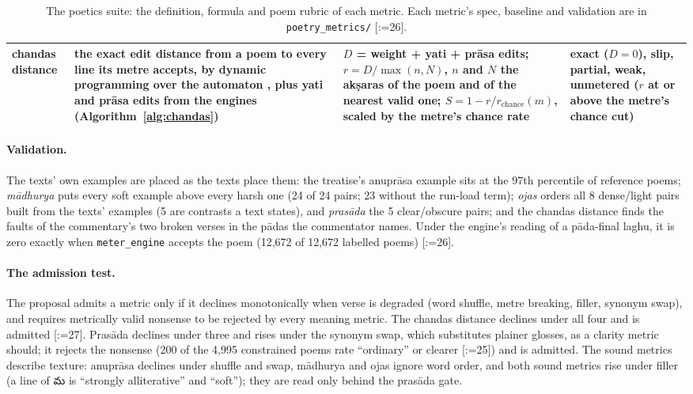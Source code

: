 \documentclass[11pt]{article}
\makeatletter
\newcommand{\te}[1]{{\telugufont #1}}
\DeclareRobustCommand{\exref}[1]{{\scriptsize[\def\ex@sep{}\@for\ex@i:=#1\do{\ex@sep
  \expandafter\ex@item\expandafter{\ex@i}\def\ex@sep{, }}]}}
\newcommand{\ex@item}[1]{\in@{-}{#1}\ifin@\ex@range#1\@nil\else\ex@link{#1}\fi}
\def\ex@range#1-#2\@nil{\ex@link{#1}--\ex@link{#2}}
\newcommand{\ex@link}[1]{\hyperref[exp:E#1]{E#1}}
\makeatother
\begin{document}
\begin{table}[t]
\begin{tabularx}{\textwidth}{@{}>{\raggedright\arraybackslash}p{1.45cm}Y>{\raggedright\arraybackslash}p{4.95cm}>{\raggedright\arraybackslash}p{3.45cm}@{}}
chandas distance & the exact edit distance from a poem to every line its metre accepts, by dynamic programming over the automaton \citep{wagner1974order,mohri2003edit}, plus yati and prāsa edits from the engines (Algorithm~\ref{alg:chandas}) & $D$ = weight + yati + prāsa edits; $r = D / \max(n, N)$, $n$ and $N$ the akṣaras of the poem and of the nearest valid one; $S = 1 - r / r_{\mathrm{chance}}(m)$, scaled by the metre's chance rate & exact ($D = 0$), slip, partial, weak, unmetered ($r$ at or above the metre's chance cut) \\
\bottomrule
\end{tabularx}
\caption{The poetics suite: the definition, formula and poem rubric of each metric. Each metric's spec,
baseline and validation are in \texttt{poetry\_metrics/} \exref{26}.}
\label{tab:metrics}
\end{table}

\paragraph{Validation.} The texts' own examples are placed as the texts place them: the treatise's anuprāsa
example sits at the 97th percentile of reference poems; \textit{mādhurya} puts every soft example above
every harsh one (24 of 24 pairs; 23 without the run-load term); \textit{ojas} orders all 8 dense/light pairs
built from the texts' examples (5 are contrasts a text states), and \textit{prasāda} the 5 clear/obscure
pairs; and the chandas distance finds the faults of the commentary's two broken verses in the pādas the
commentator names. Under the engine's reading of a pāda-final laghu, it is zero exactly when
\texttt{meter\_engine} accepts the poem (12,672 of 12,672 labelled poems) \exref{26}.

\paragraph{The admission test.} The proposal admits a metric only if it declines monotonically when verse
is degraded (word shuffle, metre breaking, filler, synonym swap), and requires metrically valid nonsense to
be rejected by every meaning metric. The chandas distance declines under all four and is admitted \exref{27}. Prasāda
declines under three and rises under the synonym swap, which substitutes plainer glosses, as a clarity
metric should; it rejects the nonsense (200 of the 4,995 constrained poems rate ``ordinary'' or clearer \exref{25}) and
is admitted. The sound metrics describe texture: anuprāsa declines under shuffle and swap, mādhurya and ojas
ignore word order, and both sound metrics rise under filler (a line of \te{మ} is ``strongly alliterative''
and ``soft''); they are read only behind the prasāda gate.
\end{document}
